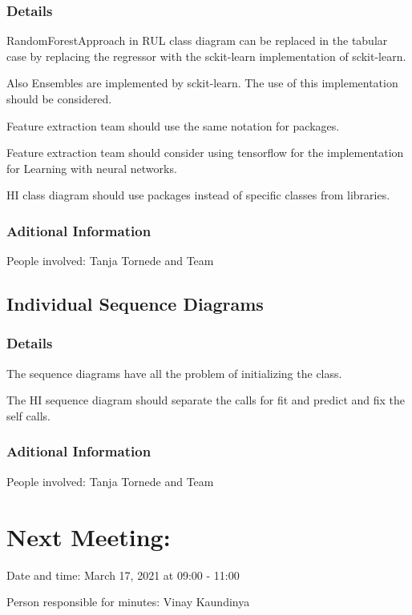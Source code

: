 \documentclass[11pt]{meetingmins} %
\begin{document}
\subsubsection{Details}
\begin{hiddensubitems}
	\item RandomForestApproach in RUL class diagram can be replaced in the tabular case by replacing the regressor with the sckit-learn implementation of sckit-learn.
	\item Also Ensembles are implemented by sckit-learn. The use of this implementation should be
	considered.
	\item Feature extraction team should use the same notation for packages.
	\item Feature extraction team should consider using tensorflow for the implementation for Learning
	with neural networks.
	\item HI class diagram should use packages instead of specific classes from libraries.
\end{hiddensubitems}
\subsubsection{Aditional Information}
\begin{hiddensubitems}
	\item People involved: Tanja Tornede and Team
\end{hiddensubitems}

\subsection{Individual Sequence Diagrams}
\subsubsection{Details}
\begin{hiddensubitems}
	\item The sequence diagrams have all the problem of initializing the class.
	\item The HI sequence diagram should separate the calls for fit and predict and fix the self calls.
\end{hiddensubitems}
\subsubsection{Aditional Information}
\begin{hiddensubitems}
	\item People involved: Tanja Tornede and Team
\end{hiddensubitems}

\section{Next Meeting:}
\begin{hiddensubitems}
	\item Date and time: March 17, 2021 at 09:00 - 11:00
	\item Person responsible for minutes: Vinay Kaundinya
\end{hiddensubitems}
\end{document}
